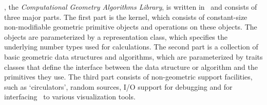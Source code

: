 \cgal, the {\em Computational Geometry Algorithms Library}, is written in 
\CC\ and consists of three major parts.
The first part is the kernel, which consists of constant-size non-modifiable 
geometric primitive objects and operations on these objects. 
The objects are parameterized by a representation class, which specifies
the underlying number types used for calculations.
The second part is a collection of basic geometric data structures and
algorithms, which are parameterized by traits classes that define the 
interface between the data structure or algorithm and the primitives they use.
The third part consists of non-geometric support facilities, such as 
`circulators', random sources, I/O support for debugging and for interfacing 
\cgal\ to various visualization tools.  
